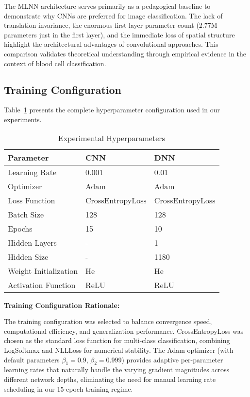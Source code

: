 \documentclass[runningheads]{llncs}
\begin{document}
The MLNN architecture serves primarily as a pedagogical baseline to demonstrate why CNNs are preferred
for image classification. The lack of translation invariance, the enormous first-layer parameter count
(2.77M parameters just in the first layer), and the immediate loss of spatial structure highlight
the architectural advantages of convolutional approaches. This comparison validates theoretical understanding
through empirical evidence in the context of blood cell classification.

\subsection{Training Configuration}

Table~\ref{tab:hyperparameters} presents the complete hyperparameter configuration used in our experiments.

\begin{table}[htbp]
\centering
\caption{Experimental Hyperparameters}
\label{tab:hyperparameters}
\begin{tabular}{lll}
\toprule
\textbf{Parameter} & \textbf{CNN} & \textbf{DNN} \\
\midrule
Learning Rate & 0.001 & 0.01 \\
Optimizer & Adam & Adam \\
Loss Function & CrossEntropyLoss & CrossEntropyLoss \\
Batch Size & 128 & 128 \\
Epochs & 15 & 10 \\
Hidden Layers & - & 1 \\
Hidden Size & - & 1180 \\
Weight Initialization & He & He \\
Activation Function & ReLU & ReLU \\
\bottomrule
\end{tabular}
\end{table}

\textbf{Training Configuration Rationale:}

The training configuration was selected to balance convergence speed, computational efficiency, and generalization performance.
CrossEntropyLoss was chosen as the standard loss function for multi-class classification, combining LogSoftmax and NLLLoss
for numerical stability. The Adam optimizer (with default parameters $\beta_1=0.9$, $\beta_2=0.999$) provides adaptive
per-parameter learning rates that naturally handle the varying gradient magnitudes across different network depths,
eliminating the need for manual learning rate scheduling in our 15-epoch training regime.
\end{document}
